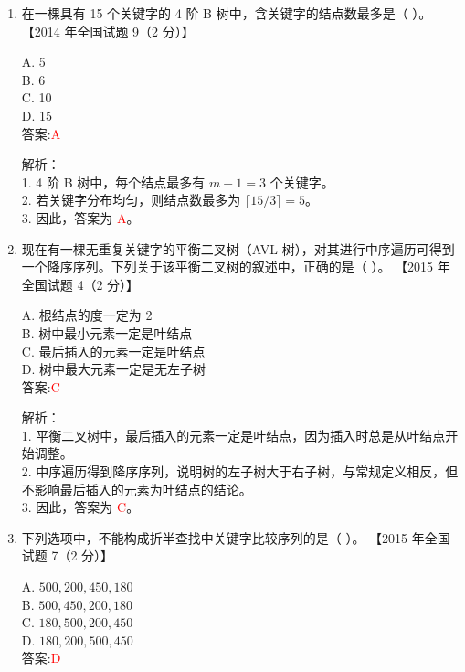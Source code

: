 \documentclass[lang=cn,newtx,10pt,scheme=chinese]{../../../elegantbook}
\begin{document}
\begin{enumerate}
\item 在一棵具有 15 个关键字的 4 阶 B 树中，含关键字的结点数最多是（ ）。  
    【2014 年全国试题 9（2 分）】  

    A. 5 \\  
    B. 6 \\  
    C. 10 \\  
    D. 15 \\  

    答案:\textcolor{red}{A}

    解析：\\
    1. 4 阶 B 树中，每个结点最多有 $m-1 = 3$ 个关键字。\\
    2. 若关键字分布均匀，则结点数最多为 $\lceil 15 / 3 \rceil = 5$。\\
    3. 因此，答案为 \textcolor{red}{A}。\\

\item 现在有一棵无重复关键字的平衡二叉树（AVL 树），对其进行中序遍历可得到一个降序序列。下列关于该平衡二叉树的叙述中，正确的是（ ）。  
    【2015 年全国试题 4（2 分）】  

    A. 根结点的度一定为 2 \\  
    B. 树中最小元素一定是叶结点 \\  
    C. 最后插入的元素一定是叶结点 \\  
    D. 树中最大元素一定是无左子树 \\  

    答案:\textcolor{red}{C}

    解析：\\
    1. 平衡二叉树中，最后插入的元素一定是叶结点，因为插入时总是从叶结点开始调整。\\
    2. 中序遍历得到降序序列，说明树的左子树大于右子树，与常规定义相反，但不影响最后插入的元素为叶结点的结论。\\
    3. 因此，答案为 \textcolor{red}{C}。\\

\item 下列选项中，不能构成折半查找中关键字比较序列的是（ ）。  
    【2015 年全国试题 7（2 分）】  

    A. $500, 200, 450, 180$ \\  
    B. $500, 450, 200, 180$ \\  
    C. $180, 500, 200, 450$ \\  
    D. $180, 200, 500, 450$ \\  

    答案:\textcolor{red}{D}


\end{enumerate}
\end{document}
